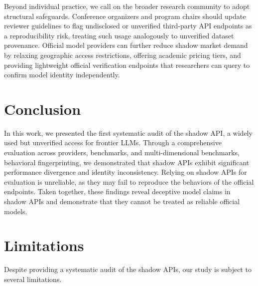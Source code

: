 \documentclass[letterpaper,twocolumn,10pt]{article}
\begin{document}
Beyond individual practice, we call on the broader research community to adopt structural safeguards.
Conference organizers and program chairs should update reviewer guidelines to flag undisclosed or unverified third-party API endpoints as a reproducibility risk, treating such usage analogously to unverified dataset provenance.
Official model providers can further reduce shadow market demand by relaxing geographic access restrictions, offering academic pricing tiers, and providing lightweight official verification endpoints that researchers can query to confirm model identity independently.
\section{Conclusion}
\label{sec:conclusion}
In this work, we presented the first systematic audit of the shadow API, a widely used but unverified access for frontier LLMs. 
Through a comprehensive evaluation across providers, benchmarks, and multi-dimensional benchmarks, behavioral fingerprinting, we demonstrated that shadow APIs exhibit significant performance divergence and identity inconsistency. Relying on shadow APIs for evaluation is unreliable, as they may fail to reproduce the behaviors of the official endpoints.
Taken together, these findings reveal deceptive model claims in shadow APIs and demonstrate that they cannot be treated as reliable official models.

\newpage

\section*{Limitations}

Despite providing a systematic audit of the shadow APIs, our study is subject to several limitations.
\end{document}
